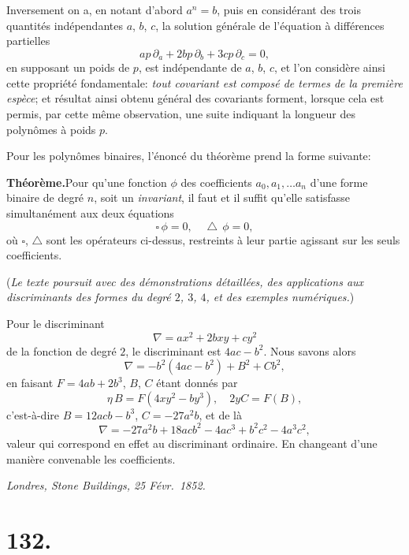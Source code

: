 \documentclass[11pt,a4paper]{article}
\begin{document}
\medskip

Inversement on a, en notant d'abord $a^n = b$, puis en consid\'erant des trois quantit\'es ind\'ependantes $a$, $b$, $c$, la solution g\'en\'erale de l'\'equation \`a diff\'erences partielles
\[
ap\,\partial_a + 2bp\,\partial_b + 3cp\,\partial_c = 0,
\]
en supposant un poids de $p$, est ind\'ependante de $a$, $b$, $c$, et l'on consid\`ere ainsi cette propri\'et\'e fondamentale: \emph{tout covariant est compos\'e de termes de la premi\`ere esp\`ece}; et r\'esultat ainsi obtenu g\'en\'eral des covariants forment, lorsque cela est permis, par cette m\^eme observation, une suite indiquant la longueur des polyn\^omes \`a poids $p$.

\medskip

Pour les polyn\^omes binaires, l'\'enonc\'e du th\'eor\`eme prend la forme suivante:

\medskip

\noindent\textbf{Th\'eor\`eme.}\quad Pour qu'une fonction $\phi$ des coefficients $a_0, a_1, \ldots a_n$ d'une forme binaire de degr\'e $n$, soit un \emph{invariant}, il faut et il suffit qu'elle satisfasse simultan\'ement aux deux \'equations
\[
\square\,\phi = 0,\quad \bigtriangleup\,\phi = 0,
\]
o\`u $\square$, $\bigtriangleup$ sont les op\'erateurs ci-dessus, restreints \`a leur partie agissant sur les seuls coefficients.

\medskip

\noindent (\emph{Le texte poursuit avec des d\'emonstrations d\'etaill\'ees, des applications aux discriminants des formes du degr\'e $2$, $3$, $4$, et des exemples num\'eriques.})

\medskip

Pour le discriminant
\[
\nabla = ax^2 + 2bxy + cy^2
\]
de la fonction de degr\'e $2$, le discriminant est $4ac - b^2$. Nous savons alors
\[
\nabla = -b^2 (4ac - b^2) + B^2 + Cb^2,
\]
en faisant $F = 4ab + 2 b^3$, $B$, $C$ \'etant donn\'es par
\[
\eta\, B = F(4xy^2 - by^3),\quad 2yC = F(B),
\]
c'est-\`a-dire $B = 12 a c b - b^3$, $C = -27 a^2 b$, et de l\`a
\[
\nabla = -27 a^2 b + 18 a c b^2 - 4ac^3 + b^2 c^2 - 4 a^3 c^2,
\]
valeur qui correspond en effet au discriminant ordinaire. En changeant d'une mani\`ere convenable les coefficients.

\medskip
\noindent\textit{Londres, Stone Buildings, 25 F\'evr.\ 1852.}


\section*{132.}
\end{document}
